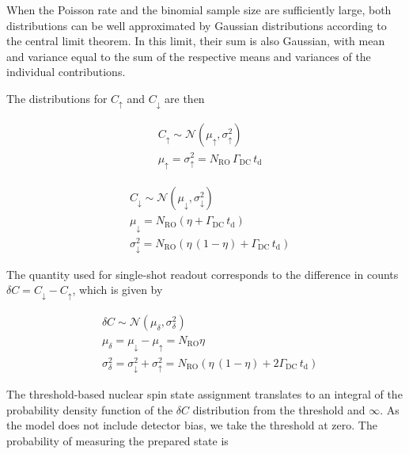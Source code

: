 When the Poisson rate and the binomial sample size are sufficiently large, both distributions can be well approximated by Gaussian distributions according to the central limit theorem. In this limit, their sum is also Gaussian, with mean and variance equal to the sum of the respective means and variances of the individual contributions.

The distributions for $C_\uparrow$ and $C_\downarrow$ are then

\begin{equation}
\begin{split}
    &C_\uparrow \sim \mathcal{N} (\mu_{\uparrow}, \sigma^2_{\uparrow}) \\
    &\mu_{\uparrow} = \sigma^2_{\uparrow} = N_\mathrm{RO} \, \Gamma_\mathrm{DC} \, t_\mathrm{d}
\end{split} 
\end{equation}

\begin{equation}
\begin{split}
    &C_\downarrow \sim \mathcal{N} (\mu_{\downarrow}, \sigma_{\downarrow}^2) \\
    &\mu_{\downarrow} = N_\mathrm{RO} \left(\eta + \Gamma_\mathrm{DC}\, t_\mathrm{d} \right) \\
    &\sigma^2_{\downarrow} = N_\mathrm{RO} \left(\eta \, (1 - \eta) +  \Gamma_\mathrm{DC} \, t_\mathrm{d} \right)
\end{split}
\end{equation}

The quantity used for single-shot readout corresponds to the difference in counts $\delta C = C_\downarrow - C_\uparrow$, which is given by 

\begin{equation}
\begin{split}
    &\delta C \sim \mathcal{N} (\mu_{\delta}, \sigma_{\delta}^2) \\
    &\mu_{\delta} = \mu_{\downarrow} - \mu_{\uparrow} =   N_\mathrm{RO} \eta \\
    &\sigma^2_{\delta} = \sigma^2_{\downarrow} + \sigma^2_{\uparrow} = N_\mathrm{RO} \left(\eta \, (1 - \eta) + 2 \Gamma_\mathrm{DC} \, t_\mathrm{d} \right)
\end{split}
\end{equation}

The threshold-based nuclear spin state assignment translates to an integral of the probability density function of the $\delta C$ distribution from the threshold and $\infty$. As the model does not include detector bias, we take the threshold at zero. The probability of measuring the prepared state is

